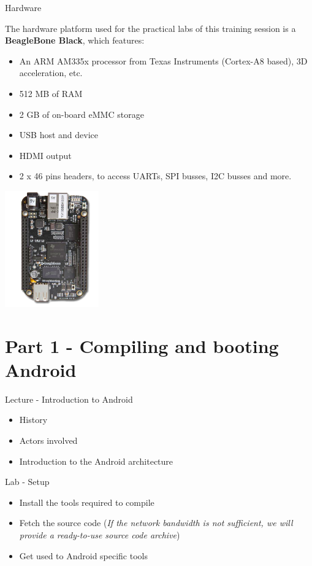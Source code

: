 \documentclass[a4paper,12pt,obeyspaces,spaces,hyphens]{article}
\begin{document}
\feagendatwocolumn
{Hardware}
{
  The hardware platform used for the practical labs of this training
  session is a {\bf BeagleBone Black}, which features:

  \begin{itemize}
  \item An ARM AM335x processor from Texas Instruments (Cortex-A8
    based), 3D acceleration, etc.
  \item 512 MB of RAM
  \item 2 GB of on-board eMMC storage
  \item USB host and device
  \item HDMI output
  \item 2 x 46 pins headers, to access UARTs, SPI busses, I2C busses
    and more.
  \end{itemize}
}
{}
{
  \begin{center}
    \includegraphics[height=5cm]{agenda/beagleboneblack.png}
  \end{center}
}

\section{Part 1 - Compiling and booting Android}

\feagendatwocolumn
{Lecture - Introduction to Android}
{
  \begin{itemize}
  \item History
  \item Actors involved
  \item Introduction to the Android architecture
  \end{itemize}
}
{Lab - Setup}
{
  \begin{itemize}
  \item Install the tools required to compile
  \item Fetch the source code (\textit{If the network bandwidth is not
      sufficient, we will provide a ready-to-use source code archive})
  \item Get used to Android specific tools
  \end{itemize}
}
\end{document}
